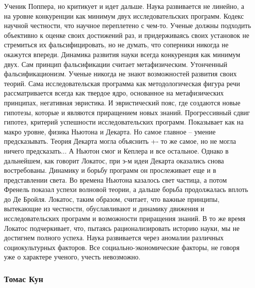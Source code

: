 \documentclass[a4paper, 12pt]{article}
\begin{document}
Ученик Поппера, но критикует и идет дальше. Наука развивается не 
линейно, а на уровне конкуренции как минимум двух исследовательских 
программ. Кодекс научной честности, что научное переплетено с чем-то. 
Ученые должны подходить объективно к оценке своих достижений раз, 
и придерживаясь своих установок не стремиться их фальсифицировать, но не 
думать, что соперники никогда не окажутся впереди. Динамика развития 
науки всегда конкуренция как минимум двух. Сам принцип фальсификации 
считает метафизическим. Утонченный фальсификационизм. Ученые никогда не 
знают возможностей развития своих теорий. Сама исследовательская 
программа как методологическая фигура речи рассматривается всегда как 
твердое ядро, основанное на метафизических принципах, негативная 
эвристика. И эвристический пояс, где создаются новые гипотезы, которые 
и являются приращением новых знаний. Прогрессивный сдвиг гипотез, 
критерий успешности исследовательских программ. Показывает как на макро 
уровне, физика Ньютона и Декарта. Но самое главное -- умение 
предсказывать. Теория Декарта могла объяснить +- то же самое, но не 
могла ничего предсказать... А Ньютон смог и Кеплера и все остальное. 
Однако в дальнейшем, как говорит Локатос, при э-м идеи Декарта оказались 
снова востребованы. Динамику и борьбу программ он прослеживает еще 
и в представлении света. Во времена Ньютона казалось свет частица, 
а потом Френель показал успехи волновой теории, а дальше борьба 
продолжалась вплоть до Де Бройля. Локатос, таким образом, считает, что 
важные принципы, вытекающие из честности, обуславливают и динамику 
движения и исследовательских программ и возможности приращения знаний. 
В то же время Локатос подчеркивает, что, пытаясь рационализировать 
историю науки, мы не достигнем полного успеха. Наука развивается через 
аномалии различных социокультурных факторов. Все социально-экономические 
факторы, не говоря уже о характере ученого, учесть невозможно.

\subsubsection{Томас Кун}
\end{document}
